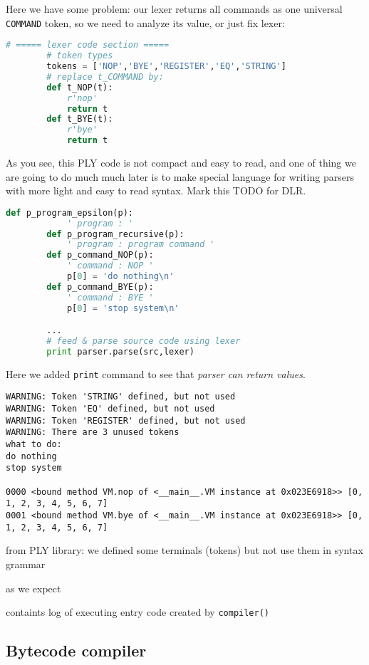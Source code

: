 \clearpage
Here we have some problem: our lexer returns all commands as one universal
\verb|COMMAND| token, so we need to analyze its value, or just fix lexer:
\begin{lstlisting}[language=python]
		# ===== lexer code section =====
		# token types
		tokens = ['NOP','BYE','REGISTER','EQ','STRING']
		# replace t_COMMAND by:
		def t_NOP(t):
			r'nop'
			return t
		def t_BYE(t):
			r'bye'
			return t
\end{lstlisting}
As you see, this PLY code is not compact and easy to read, and one of thing we
are going to do much much later is to make special language for writing parsers
with more light and easy to read syntax. Mark this TODO for DLR.
\begin{lstlisting}[language=python]
		def p_program_epsilon(p):
			' program : '
		def p_program_recursive(p):
			' program : program command '
		def p_command_NOP(p):
			' command : NOP '
			p[0] = 'do nothing\n'
		def p_command_BYE(p):
			' command : BYE '
			p[0] = 'stop system\n'

		...
		# feed & parse source code using lexer
		print parser.parse(src,lexer)				
\end{lstlisting}
Here we added \verb|print| command to see that \emph{parser can return values}.
\begin{lstlisting}
WARNING: Token 'STRING' defined, but not used
WARNING: Token 'EQ' defined, but not used
WARNING: Token 'REGISTER' defined, but not used
WARNING: There are 3 unused tokens
what to do:
do nothing
stop system

0000 <bound method VM.nop of <__main__.VM instance at 0x023E6918>> [0, 1, 2, 3, 4, 5, 6, 7]
0001 <bound method VM.bye of <__main__.VM instance at 0x023E6918>> [0, 1, 2, 3, 4, 5, 6, 7]
\end{lstlisting}
\begin{description}[nosep]
\item[warnings] from PLY library: we defined some terminals (tokens) but not use
them in syntax grammar
\item[string returned from parser] as we expect
\item[program trace] containts log of executing entry code created by
\verb|compiler()|
\end{description}

\subsection{Bytecode compiler}

